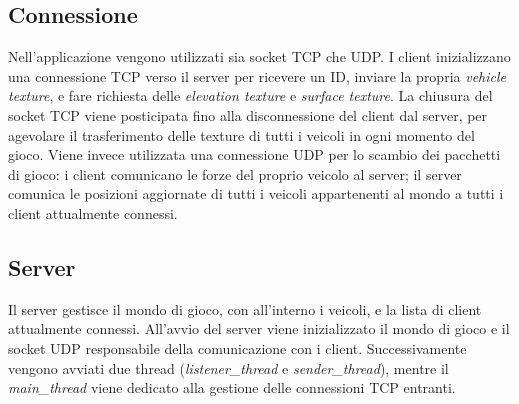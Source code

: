 \documentclass{article}
\begin{document}
\subsection*{Connessione}
Nell'applicazione vengono utilizzati sia socket TCP che UDP.
I client inizializzano una connessione TCP verso il server per ricevere un ID, inviare la propria \textit{vehicle texture}, e fare richiesta delle \textit{elevation texture} e \textit{surface texture}.
La chiusura del socket TCP viene posticipata fino alla disconnessione del client dal server, per agevolare il trasferimento delle texture di tutti i veicoli in ogni momento del gioco.
Viene invece utilizzata una connessione UDP per lo scambio dei pacchetti di gioco: i client comunicano le forze del proprio veicolo al server; il server comunica le posizioni aggiornate di tutti i veicoli appartenenti al mondo a tutti i client attualmente connessi.

\subsection*{Server}
Il server gestisce il mondo di gioco, con all'interno i veicoli, e la lista di client attualmente connessi. All'avvio del server viene inizializzato il mondo di gioco e il socket UDP responsabile della comunicazione con i client. Successivamente vengono avviati due thread (\textit{listener\_thread} e \textit{sender\_thread}), mentre il \textit{main\_thread} viene dedicato alla gestione delle connessioni TCP entranti.
\end{document}
